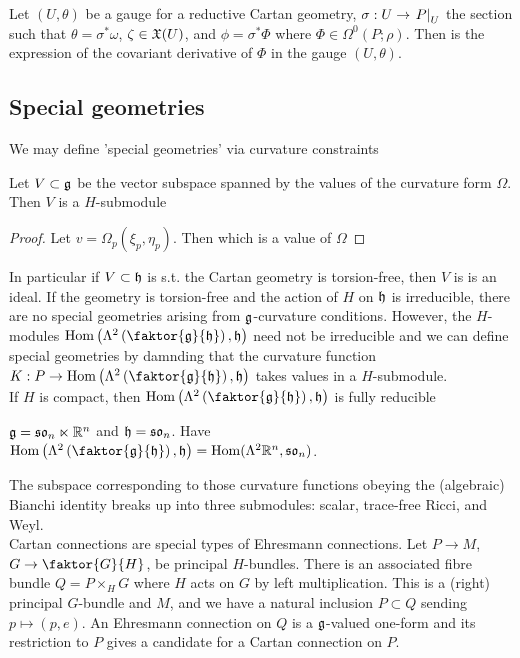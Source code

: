 \documentclass{article}
\begin{document}
\begin{prop}
Let $(U,\theta)$ be a gauge for a reductive Cartan geometry, $\sigma : U \to \left. P \right\rvert_{U}$ the section such that $\theta = \sigma^\ast \omega$, $\zeta \in \mathfrak{X}(U)$, and $\phi = \sigma^\ast \Phi$ where $\Phi \in \Omega^0(P;\rho)$. Then 
is the expression of the covariant derivative of $\Phi$ in the gauge $(U,\theta)$. 
\end{prop}

\subsection{Special geometries}

We may define 'special geometries' via curvature constraints 

\begin{lemma}
Let $V \subset \mathfrak{g}$ be the vector subspace spanned by the values of the curvature form $\Omega$. Then $V$ is a $H$-submodule
\end{lemma}
\begin{proof}
Let $v = \Omega_p(\xi_p,\eta_p)$. Then 
which is a value of $\Omega$
\end{proof}

In particular if $V \subset \mathfrak{h}$ is s.t. the Cartan geometry is torsion-free, then $V$ is is an ideal. If the geometry is torsion-free and the action of $H$ on $\mathfrak{h}$ is irreducible, there are no special geometries arising from $\mathfrak{g}$-curvature conditions. However, the $H$-modules $\Hom\pround{\Lambda^2 \pround{\faktor{\mf{g}}{\mf{h}}},\mf{h}}$ need not be irreducible and we can define special geometries by damnding that the curvature function $K : P \to \Hom\pround{\Lambda^2 \pround{\faktor{\mf{g}}{\mf{h}}},\mf{h}}$ takes values in a $H$-submodule. \\
If $H$ is compact, then $\Hom\pround{\Lambda^2 \pround{\faktor{\mf{g}}{\mf{h}}},\mf{h}}$ is fully reducible
\begin{example}
$\mathfrak{g} = \mathfrak{so}_n \ltimes \mathbb{R}^n$ and $\mathfrak{h} = \mathfrak{so}_n$. Have $\Hom\pround{\Lambda^2 \pround{\faktor{\mf{g}}{\mf{h}}},\mf{h}} = \Hom(\Lambda^2 \mbb{R}^n,\mf{so}_n)$. 
\end{example}
The subspace corresponding to those curvature functions obeying the (algebraic) Bianchi identity breaks up into three submodules: scalar, trace-free Ricci, and Weyl. \\
Cartan connections are special types of Ehresmann connections. Let $P \to M$, $G \to \faktor{G}{H}$, be principal $H$-bundles. There is an associated fibre bundle $Q = P\times_H G$ where $H$ acts on $G$ by left multiplication. This is a (right) principal $G$-bundle and $M$, and we have a natural inclusion $P \subset Q$ sending $p \mapsto (p,e)$. An Ehresmann connection on $Q$ is a $\mathfrak{g}$-valued one-form and its restriction to $P$ gives a candidate for a Cartan connection on $P$.
\end{document}
